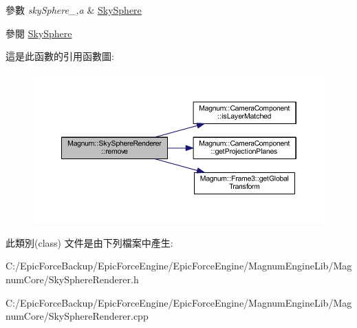 \begin{DoxyParams}{參數}
{\em sky\+Sphere\+\_\+,a} & \hyperlink{class_magnum_1_1_sky_sphere}{Sky\+Sphere} \\
\hline
\end{DoxyParams}
\begin{DoxySeeAlso}{參閱}
\hyperlink{class_magnum_1_1_sky_sphere}{Sky\+Sphere} 
\end{DoxySeeAlso}


這是此函數的引用函數圖\+:\nopagebreak
\begin{figure}[H]
\begin{center}
\leavevmode
\includegraphics[width=350pt]{class_magnum_1_1_sky_sphere_renderer_a2b7bd339a31bebd9c1770d591ad5f28f_cgraph}
\end{center}
\end{figure}




此類別(class) 文件是由下列檔案中產生\+:\begin{DoxyCompactItemize}
\item 
C\+:/\+Epic\+Force\+Backup/\+Epic\+Force\+Engine/\+Epic\+Force\+Engine/\+Magnum\+Engine\+Lib/\+Magnum\+Core/Sky\+Sphere\+Renderer.\+h\item 
C\+:/\+Epic\+Force\+Backup/\+Epic\+Force\+Engine/\+Epic\+Force\+Engine/\+Magnum\+Engine\+Lib/\+Magnum\+Core/Sky\+Sphere\+Renderer.\+cpp\end{DoxyCompactItemize}
